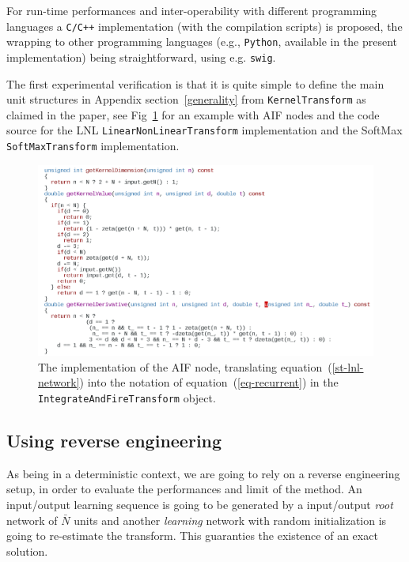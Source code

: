 For run-time performances and inter-operability with different programming languages a {\tt C/C++} implementation (with the compilation scripts) is proposed, the wrapping to other programming languages (e.g., {\tt Python}, available in the present implementation) being straightforward, using e.g. {\tt swig}. 

The first experimental verification is that it is quite simple to define the main unit structures in Appendix section~\ref{generality} from {\tt KernelTransform} as claimed in the paper, see Fig~\ref{AIF-kernel-implementation} for an example with AIF nodes and the code source for the LNL {\tt LinearNonLinearTransform} implementation and the SoftMax {\tt SoftMaxTransform} implementation.

\begin{figure}[!ht]
  \includegraphics[width=\textwidth]{img/AIF-kernel-implementation}
  \caption{The implementation of the AIF node, translating equation~(\ref{st-lnl-network}) into the notation of equation~(\ref{eq-recurrent}) in the {\tt IntegrateAndFireTransform} object.}
  \label{AIF-kernel-implementation}
\end{figure}

\subsection*{Using reverse engineering}

As being in a deterministic context, we are going to rely on a reverse engineering setup, in order to evaluate the performances and limit of the method. An input/output learning sequence is going to be generated by a input/output {\em root} network of $\bar{N}$ units and another {\em learning} network with random initialization is going to re-estimate the transform. This guaranties the existence of an exact solution. 

